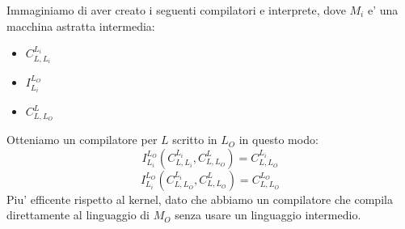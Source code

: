 \begin{itemize}
    Immaginiamo di aver creato i seguenti compilatori e interprete, dove $ M_i $ e' una macchina astratta intermedia:
    \begin{itemize}
      \item $ C^{L_i}_{L, L_i} $
      \item $ I^{L_O}_{L_i} $
      \item $ C^L_{L, L_O} $
    \end{itemize}
    Otteniamo un compilatore per $ L $ scritto in $ L_O $ in questo modo:
    \[
      I^{L_O}_{L_i}(C^{L_i}_{L, L_i}, C^L_{L, L_O}) = C^{L_i}_{L, L_O}
    \]
    \[
      I^{L_O}_{L_i}(C^{L_i}_{L, L_O}, C^L_{L, L_O}) = C^{L_O}_{L, L_O}
    \]
    Piu' efficente rispetto al kernel, dato che abbiamo un compilatore che compila direttamente al linguaggio di $ M_O $ senza usare un linguaggio intermedio.

\end{itemize}
